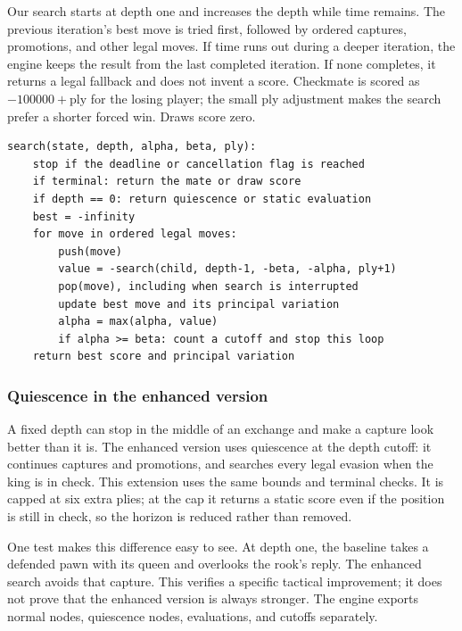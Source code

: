 \documentclass[oneside,final]{hcmut-report}
\begin{document}
Our search starts at depth one and increases the depth while time remains.
The previous iteration's best move is tried first, followed by ordered captures,
promotions, and other legal moves. If time runs out during a deeper iteration,
the engine keeps the result from the last completed iteration. If none
completes, it returns a legal fallback and does not invent a score.
Checkmate is scored as $-100000+\text{ply}$ for the losing player; the small
ply adjustment makes the search prefer a shorter forced win. Draws score zero.
\begin{lstlisting}[caption={The main Alpha-beta search in Negamax form.}]
search(state, depth, alpha, beta, ply):
    stop if the deadline or cancellation flag is reached
    if terminal: return the mate or draw score
    if depth == 0: return quiescence or static evaluation
    best = -infinity
    for move in ordered legal moves:
        push(move)
        value = -search(child, depth-1, -beta, -alpha, ply+1)
        pop(move), including when search is interrupted
        update best move and its principal variation
        alpha = max(alpha, value)
        if alpha >= beta: count a cutoff and stop this loop
    return best score and principal variation
\end{lstlisting}

\subsubsection{Quiescence in the enhanced version}
A fixed depth can stop in the middle of an exchange and make a capture look
better than it is. The enhanced version uses quiescence at the depth cutoff:
it continues captures and promotions, and searches every legal evasion when
the king is in check. This extension uses the same bounds and terminal checks.
It is capped at six extra plies; at the cap it returns a static score even if
the position is still in check, so the horizon is reduced rather than removed.

One test makes this difference easy to see. At depth one, the baseline takes
a defended pawn with its queen and overlooks the rook's reply. The enhanced
search avoids that capture. This verifies a specific tactical improvement;
it does not prove that the enhanced version is always stronger. The engine
exports normal nodes, quiescence nodes, evaluations, and cutoffs separately.
\end{document}
